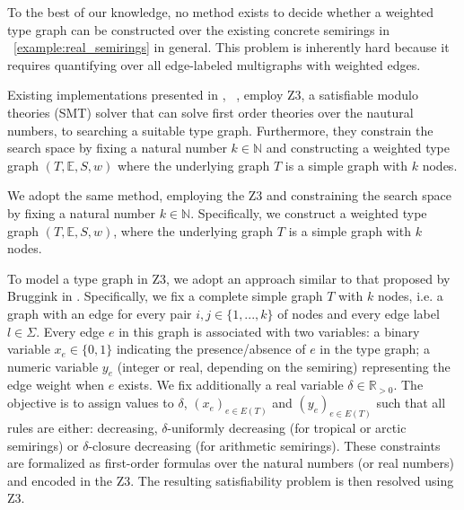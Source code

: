 To the best of our knowledge, no method exists to decide whether a weighted type graph can be constructed over the existing concrete semirings in ~\autoref{example:real_semirings} in general. 
This problem is inherently hard because it requires quantifying over all edge-labeled multigraphs with weighted edges.

Existing implementations presented in \cite[]{bruggink2015proving}, ~\cite[]{zantema2014termination}, \cite[\textsection E]{endrullis2024generalized} employ Z3, a satisfiable modulo theories (SMT) solver that can solve first order theories over the nautural numbers, to searching a suitable type graph.
Furthermore, they constrain the search space by fixing a natural number
\( k \in \mathbb{N} \) and constructing a weighted type graph \((T, \mathbb{E}, S, w)\) where the underlying graph \( T \) is a simple graph with \( k \) nodes.

We adopt the same method, employing the Z3 and constraining the search space by fixing a natural number \( k \in \mathbb{N} \). Specifically, we construct a weighted type graph \((T, \mathbb{E}, S, w)\), where the underlying graph \( T \) is a simple graph with \( k \) nodes.

To model a type graph in Z3, we adopt an approach similar to that proposed by Bruggink in \cite[]{bruggink2015proving}.
Specifically, we fix a complete simple graph $T$ with $k$ nodes, i.e. a graph with an edge for every pair $i,j\in\{1,...,k\}$ of nodes and every edge label $l \in \Sigma$. 
Every edge $e$ in this graph is associated with two variables:
a binary variable \( x_e \in \{0,1\} \) indicating the presence/absence of \( e \) in the type graph;
a numeric variable \( y_e \) (integer or real, depending on the semiring) representing the edge weight when \( e \) exists.  
We fix additionally a real variable $\delta \in \mathbb{R}_{>0}$.
The objective is to assign values to $\delta$, \( (x_e)_{e \in E(T)} \) and \( (y_e)_{e \in E(T)} \) such that all rules are either: decreasing, $\delta$-uniformly decreasing (for tropical or arctic semirings) or \(\delta\)-closure decreasing (for arithmetic semirings).  
These constraints are formalized as first-order formulas over the natural numbers (or real numbers) and encoded in the Z3. The resulting satisfiability problem is then resolved using Z3.

